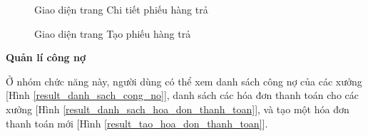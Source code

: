\begin{figure}[H]
    \begin{center}
        \caption{Giao diện trang Chi tiết phiếu hàng trả}
        \label{result_chi_tiet_hang_tra}
    \end{center}
\end{figure}

\begin{figure}[H]
    \begin{center}
        \caption{Giao diện trang Tạo phiếu hàng trả}
        \label{result_tao_hang_tra}
    \end{center}
\end{figure}

\textbf{Quản lí công nợ}

Ở nhóm chức năng này, người dùng có thể xem danh sách công nợ của các xưởng [Hình \ref{result_danh_sach_cong_no}], danh sách các hóa đơn thanh toán cho các xưởng [Hình \ref{result_danh_sach_hoa_don_thanh_toan}], và tạo một hóa đơn thanh toán mới [Hình \ref{result_tao_hoa_don_thanh_toan}].

